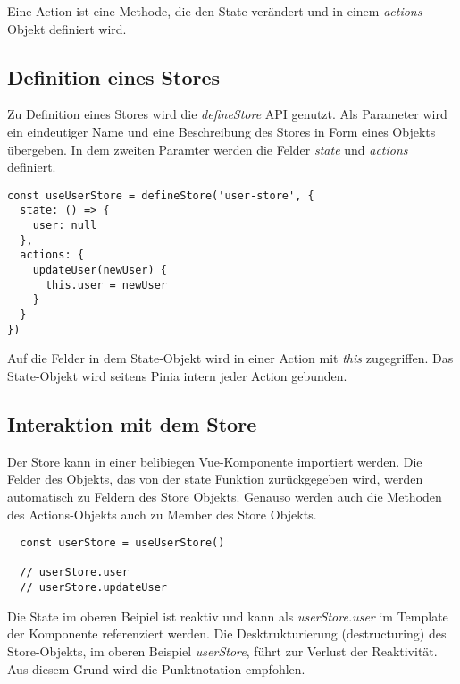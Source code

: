 Eine Action ist eine Methode, die den State verändert und in einem \textit{actions} Objekt definiert wird.

\subsection{Definition eines Stores}

Zu Definition eines Stores wird die \textit{defineStore} API genutzt. Als Parameter wird ein eindeutiger Name und eine Beschreibung des Stores in Form eines Objekts übergeben. In dem zweiten Paramter werden die Felder \textit{state} und \textit{actions} definiert.

\begin{lstlisting}
const useUserStore = defineStore('user-store', {
  state: () => {
    user: null
  },
  actions: {
    updateUser(newUser) {
      this.user = newUser
    }
  }
})
\end{lstlisting}

Auf die Felder in dem State-Objekt wird in einer Action mit \textit{this} zugegriffen. Das State-Objekt wird seitens Pinia intern jeder Action gebunden.

\subsection{Interaktion mit dem Store}

Der Store kann in einer belibiegen Vue-Komponente importiert werden. Die Felder des Objekts, das von der state Funktion zurückgegeben wird, werden automatisch zu Feldern des Store Objekts. Genauso werden auch die Methoden des Actions-Objekts auch zu Member des Store Objekts.

\begin{lstlisting}
  const userStore = useUserStore()
  
  // userStore.user
  // userStore.updateUser
\end{lstlisting}

Die State im oberen Beipiel ist reaktiv und kann als \textit{userStore.user} im Template der Komponente referenziert werden. Die Desktrukturierung (destructuring) des Store-Objekts, im oberen Beispiel \textit{userStore}, führt zur Verlust der Reaktivität. Aus diesem Grund wird die Punktnotation empfohlen.\cite{piniaDefiningAStore}
